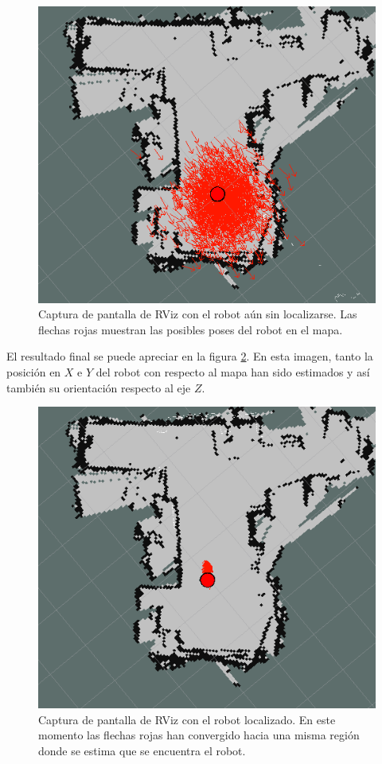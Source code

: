 \begin{figure}[ht]
    \centering
    \includegraphics[scale=0.4]{./Figures/sin_localizar.png}
    \caption{Captura de pantalla de RViz con el robot aún sin localizarse. Las flechas rojas muestran las posibles poses del robot en el mapa.}
    \label{fig:sinLocalizar}
\end{figure}

El resultado final se puede apreciar en la figura \ref{fig:robotLocalizado}. En esta imagen, tanto la posición en $X$ e $Y$ del robot con respecto al mapa han sido estimados y así también su orientación respecto al eje $Z$.

\begin{figure}[ht]
    \centering
    \includegraphics[scale=0.4]{./Figures/robot_localizado.png}
    \caption{Captura de pantalla de RViz con el robot localizado. En este momento las flechas rojas han convergido hacia una misma región donde se estima que se encuentra el robot.}
    \label{fig:robotLocalizado}
\end{figure}

